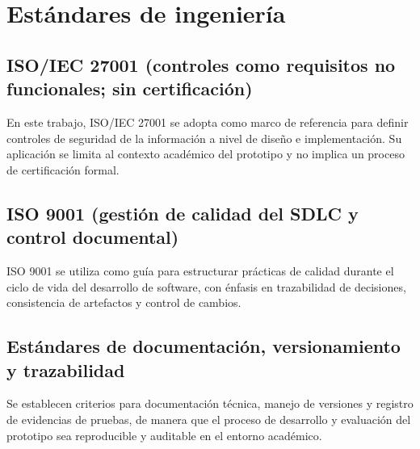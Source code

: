 
\section{Estándares de ingeniería}

\subsection{ISO/IEC 27001 (controles como requisitos no funcionales; sin certificación)}

En este trabajo, ISO/IEC 27001 se adopta como marco de referencia para definir controles de seguridad de la información a nivel de diseño e implementación. Su aplicación se limita al contexto académico del prototipo y no implica un proceso de certificación formal.

\subsection{ISO 9001 (gestión de calidad del SDLC y control documental)}

ISO 9001 se utiliza como guía para estructurar prácticas de calidad durante el ciclo de vida del desarrollo de software, con énfasis en trazabilidad de decisiones, consistencia de artefactos y control de cambios.

\subsection{Estándares de documentación, versionamiento y trazabilidad}

Se establecen criterios para documentación técnica, manejo de versiones y registro de evidencias de pruebas, de manera que el proceso de desarrollo y evaluación del prototipo sea reproducible y auditable en el entorno académico.
